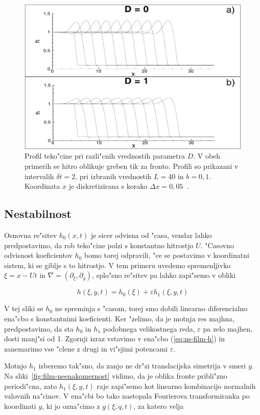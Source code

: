 \documentclass[a4paper,10pt]{article}
\newcommand{\eps}{\varepsilon}
\begin{document}
\begin{figure}[h]
 \centering
 \includegraphics[width=.8\textwidth]{./Slike/film-osnovna-resitev}
 \caption{Profil teko"cine pri razli"cnih vrednostih parametra $D$. V obeh primerih se hitro oblikuje greben tik za fronto. Profili so prikazani v intervalih $\delta t = 2$, pri izbranih vrednostih $L = 40$ in $b=0,1$. Koordinata $x$ je diskretizirana s korako $\Delta x = 0,05$~\cite{kondic}. }
 \label{fig:film-osnovna}
\end{figure}


\subsection{Nestabilnost}

Osnovna re"sitev $h_0(x, t)$ je sicer odvisna od "casa, vendar lahko predpostavimo, da rob teko"cine polzi s konstantno hitrostjo $U$. "Casovno odvisnost koeficientov $h_0$ bomo torej odpravili, "ce se postavimo v koordinatni sistem, ki se giblje s to hitrostjo. V tem primeru uvedemo spremenljivko $\xi = x - Ut$ in $\nabla = (\partial_\xi, \partial_y)$, splo"sno re"sitev pa lahko zapi"semo v obliki

\begin{equation}
 h(\xi, y, t) = h_0(\xi) + \eps h_1(\xi, y, t)
\end{equation}

V tej sliki se $h_0$ ne spreminja s "casom, torej smo dobili linearno diferencialno ena"cbo s konstantnimi koeficienti. Ker "zelimo, da je motnja res majhna, predpostavimo, da sta $h_0$ in $h_1$ podobnega velikostnega reda, $\eps$ pa zelo majhen, dosti manj"si od 1. Zgornji izraz vstavimo v ena"cbo (\ref{eq:ns-film-h}) in zanemarimo vse "clene z drugi in vi"sjimi potencami $\eps$. 

Motnjo $h_1$ izberemo tak"sno, da zanjo ne dr"zi translacijska simetrija v smeri $y$. Na sliki~\ref{fig:film-neenakomernost} vidimo, da je oblika fronte pribli"zno periodi"cna, zato $h_1(\xi, y, t)$ raje zapi"semo kot linearno kombinacijo normalnih valovnih na"cinov. V ena"cbi bo tako nastopala Fourierova transformiranka po koordinati $y$, ki jo ozna"cimo z $g(\xi, q, t)$, za katero velja
\end{document}
